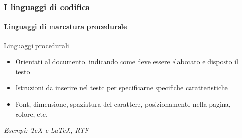 \documentclass{beamer}
\begin{document}
\begin{frame}
	\frametitle{I linguaggi di codifica}
	\framesubtitle{Linguaggi di marcatura procedurale}
	\addtocounter{nframe}{1}

	\begin{block}{Linguaggi procedurali}
		\begin{itemize}
			\item Orientati al documento, indicando come deve essere elaborato e
			      disposto il testo
			\item Istruzioni da inserire nel testo per specificarne specifiche
			      caratteristiche
			\item Font, dimensione, spaziatura del carattere, posizionamento
			      nella pagina, colore, etc.
		\end{itemize}
	\end{block}

	\textit{Esempi: TeX e LaTeX, RTF}

\end{frame}

\begin{frame}[fragile]
	\frametitle{I linguaggi di codifica}
	\framesubtitle{Linguaggi di marcatura procedurale}
	\addtocounter{nframe}{1}

	\defverbatim{\rtf}{%
		\begin{tiny}
			\begin{verbatim}

    {\rtf1\ansi\deff0\adeflang1025
    {\fonttbl{\f0\froman\fprq2\fcharset0 Times New Roman;}
    {\f1\froman\fprq2\fcharset0 Times New Roman;}
    {\f2\fnil\fprq2\fcharset0 Lucida Sans Unicode;}
    {\colortbl;\red0\green0\blue0;\red128\green128\blue128;}
    {\stylesheet{\s1\cf0{\*\hyphen2\hyphlead2\hyphtrail2\hyphmax0}
    \rtlch\af5\afs24\lang255\ltrch\dbch\af2\afs24\langfe255
    \loch\f0\fs24\lang1040\snext1 Standard;}

        \end{verbatim}
		\end{tiny}
	}

	\begin{block}{Esempio RTF}
		{\rtf}
	\end{block}

\end{frame}
\end{document}

